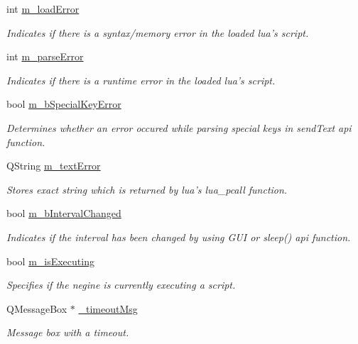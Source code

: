 \begin{DoxyCompactItemize}
int \hyperlink{class_lua_engine_af8dca74620280060399b5b7dd937af44}{m\-\_\-load\-Error}
\begin{DoxyCompactList}\small\item\em Indicates if there is a syntax/memory error in the loaded lua's script. \end{DoxyCompactList}\item 
int \hyperlink{class_lua_engine_ac7c65e343f73a0dadcbe2d5f1a5842f3}{m\-\_\-parse\-Error}
\begin{DoxyCompactList}\small\item\em Indicates if there is a runtime error in the loaded lua's script. \end{DoxyCompactList}\item 
bool \hyperlink{class_lua_engine_a5cac380e1359eb5a6cf95239e4ad2b19}{m\-\_\-b\-Special\-Key\-Error}
\begin{DoxyCompactList}\small\item\em Determines whether an error occured while parsing special keys in send\-Text api function. \end{DoxyCompactList}\item 
Q\-String \hyperlink{class_lua_engine_a0cb5dc043a3f9b162ad97245cd7e6956}{m\-\_\-text\-Error}
\begin{DoxyCompactList}\small\item\em Stores exact string which is returned by lua's lua\-\_\-pcall function. \end{DoxyCompactList}\item 
bool \hyperlink{class_lua_engine_add74083d158ee3543d0644c0b6349c5d}{m\-\_\-b\-Interval\-Changed}
\begin{DoxyCompactList}\small\item\em Indicates if the interval has been changed by using G\-U\-I or sleep() api function. \end{DoxyCompactList}\item 
bool \hyperlink{class_lua_engine_ad2bf267f4030d958e5a6f88a3a19e039}{m\-\_\-is\-Executing}
\begin{DoxyCompactList}\small\item\em Specifies if the negine is currently executing a script. \end{DoxyCompactList}\item 
Q\-Message\-Box $\ast$ \hyperlink{class_lua_engine_a427a0ecc61c8b6b06bc0b4e86f32ae2d}{\-\_\-timeout\-Msg}
\begin{DoxyCompactList}\small\item\em Message box with a timeout. \end{DoxyCompactList}\item 

\end{DoxyCompactItemize}
